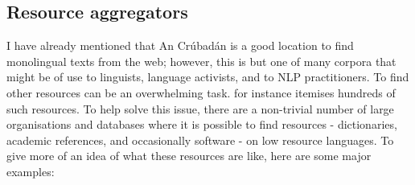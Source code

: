 \subsection{Resource aggregators}
\label{subsec:resource-aggregators}

I have already mentioned that An Cr\'ubad\'an \citep{scannell2007crubadan} is a good location to find monolingual texts from the web; however, this is but one of many corpora that might be of use to linguists, language activists, and to NLP practitioners. To find other resources can be an overwhelming task. \citet{unesco11directory} for instance itemises hundreds of such resources. To help solve this issue, there are a non-trivial number of large organisations and databases where it is possible to find resources - dictionaries, academic references, and occasionally software - on low resource languages. To give more of an idea of what these resources are like, here are some major examples:

